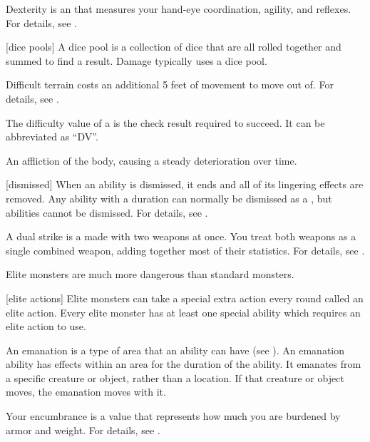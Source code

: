  Dexterity is an  that measures your hand-eye coordination, agility, and reflexes.
For details, see .

[dice pools] A dice pool is a collection of dice that are all rolled together and summed to find a result.
Damage typically uses a dice pool.

 Difficult terrain costs an additional 5 feet of movement to move out of.
For details, see .

 The difficulty value of a  is the check result required to succeed.
It can be abbreviated as ``DV''.

 An affliction of the body, causing a steady deterioration over time.

[dismissed] When an ability is dismissed, it ends and all of its lingering effects are removed.
Any \magical ability with a duration can normally be dismissed as a , but  abilities cannot be dismissed.
For details, see .

 A dual strike is a  made with two weapons at once.
You treat both weapons as a single combined weapon, adding together most of their statistics.
For details, see .

 Elite monsters are much more dangerous than standard monsters.

[elite actions] Elite monsters can take a special extra action every round called an elite action.
Every elite monster has at least one special ability which requires an elite action to use.

 An emanation is a type of area that an ability can have (see ).
An emanation ability has effects within an area for the duration of the ability.
It emanates from a specific creature or object, rather than a location.
If that creature or object moves, the emanation moves with it.

 Your encumbrance is a value that represents how much you are burdened by armor and weight.
For details, see .

